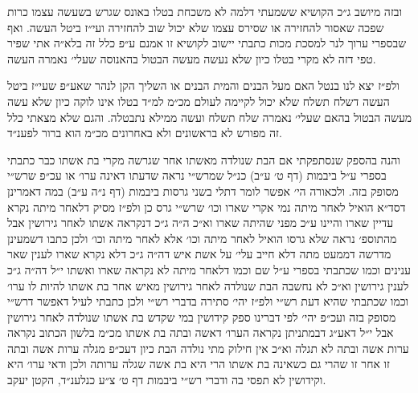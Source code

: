 \documentclass[12pt, openany]{book}
\begin{document}
\begin{multicols}{2}
ובזה מיושב ג״כ הקושיא ששמעתי דלמה לא משכחת בטלו באונס שגרש בשעשה עצמו כרות שפכה שאסור להחזירה או שסירס עצמו שלא יכול שוב להחזירה ועי״ז ביטל העשה. ואף שבספרי ערוך לנר למסכת מכות כתבתי יישוב לקושיא זו אמנם ע״פ כלל זה בלא״ה אתי שפיר טפי דזה לא מקרי בטלו כיון שלא נעשה מעשה הבטול בהאנוסה שעלי׳ נאמרה העשה.\\\vspace{0pt}

ולפ״ז יצא לנו בנטל האם מעל הבנים והמית הבנים או השליך הקן לנהר שאע״פ שעי״ז ביטל העשה דשלח תשלח שלא יכול לקיימה לעולם מכ״מ למ״ד בטלו אינו לוקה כיון שלא עשה מעשה הבטול בהאם שעלי׳ נאמרה שלח תשלח ועשה ממילא נתבטלה. והגם שלא מצאתי כלל זה מפורש לא בראשונים ולא באחרונים מכ״מ הוא ברור לפענ״ד.\\\vspace{0pt}

והנה בהספק שנסתפקתי אם הבת שנולדה מאשתו אחר שגרשה מקרי בת אשתו כבר כתבתי בספרי ע״ל ביבמות (דף ט׳ ע״ב) כנ״ל שמרש״י נראה שדעתו דאינה ערו׳ או עכ״פ שרש״י מסופק בזה. ולכאורה הי׳ אפשר לומר דתלי בשני גרסות ביבמות (דף נ״ה ע״ב) במה דאמרינן דסד״א הואיל לאחר מיתה נמי אקרי שארו וכו׳ שרש״י גרס כן ולפ״ז מסיק דלאחר מיתה נקרא עדיין שארו והיינו ע״כ מפני שהיתה שארו וא״כ ה״ה ג״כ דנקראה אשתו לאחר גירושין אבל מהתוספ׳ נראה שלא גרסו הואיל לאחר מיתה וכו׳ אלא לאחר מיתה וכו׳ ולכן כתבו דשמעינן מדרשה דממעט מתה דלא חייב עלי׳ על אשת איש דה״ה ג״כ דלא נקרא שארו לענין שאר ענינים וכמו שכתבתי בספרי ע״ל שם וכמו דלאחר מיתה לא נקראה שארו ואשתו י״ל דה״ה ג״כ לענין גירושין וא״כ לא נחשבה הבת שנולדה לאחר גירושין מאיש אחר בת אשתו להיות לו ערו׳ וכמו שכתבתי שהיא דעת רש״י ולפ״ז יהי׳ סתירה בדברי רש״י ולכן כתבתי לעיל דאפשר דרש״י מסופק בזה ועכ״פ יהי׳ לפי דברינו ספק קידושין במי שקדש בת אשתו שנולדה לאחר גירושין אבל י״ל דאע״ג דבמתניתן נקראה הערו׳ דאשה ובתה בת אשתו מכ״מ בלשון הכתוב נקראה ערות אשה ובתה לא תגלה וא״כ אין חילוק מתי נולדה הבת כיון דעכ״פ מגלה ערות אשה ובתה זו אחר זו שהרי גם כשאינה בת אשתו הרי היא בת אשה שגלה ערותה ולכן ודאי ערו׳ היא וקידושין לא תפסי בה ודברי רש״י ביבמות דף ט׳ צ״ע כנלענ״ד, הקטן יעקב.\\\vspace{0pt}

\end{multicols}\newpage
\end{document}
